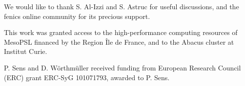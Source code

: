 \begin{acknowledgments}
    We would like to thank S. Al-Izzi and S. Astruc for useful discussions, and  the \ac{fenics} online community for its precious support.

    This work was granted access to the high-performance computing resources of MesoPSL financed by the Region
    \^Ile de France, and to the Abacus cluster at Institut Curie.

    P. Sens and D. W\"orthm\"uller received funding from  European Research Council (ERC) grant ERC-SyG 101071793, awarded to P. Sens.

\end{acknowledgments}
